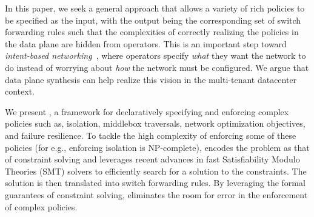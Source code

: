 

In this paper, we seek a general approach that allows a variety
of rich policies to be specified as the input, with the output being
the corresponding set of switch forwarding rules such that the
complexities of correctly realizing the policies in the data plane are
hidden from operators. This is an important step toward {\em
  intent-based networking}~\cite{intent}, where operators specify {\em
  what} they want the network to do instead of worrying about {\em
  how} the network must be configured.
We argue that data plane synthesis can help 
realize this vision in the multi-tenant datacenter
context.

We present \Name, a framework for declaratively specifying and
enforcing complex policies such as, isolation, middlebox traversals,
network optimization objectives, and failure resilience. To tackle the
high complexity of enforcing some of these policies (for e.g.,
enforcing isolation is NP-complete), \Name encodes the problem as that
of constraint solving and leverages recent advances in fast
Satisfiability Modulo Theories (SMT) solvers to efficiently search for
a solution to the constraints.  The solution is then translated into
switch forwarding rules.
By leveraging the formal guarantees of constraint solving, \Name
eliminates the room for error in the enforcement of complex
policies.

